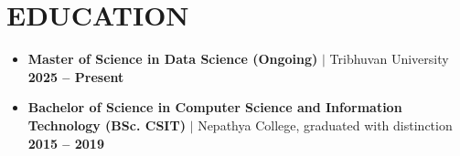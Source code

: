 \documentclass[10pt,a4paper]{article}
\begin{document}
\section{EDUCATION}
\begin{itemize}
    \item \textbf{Master of Science in Data Science (Ongoing)} $|$ Tribhuvan University \hfill \textbf{2025 -- Present}
    \item \textbf{Bachelor of Science in Computer Science and Information Technology (BSc. CSIT)} $|$ Nepathya College, graduated with distinction \hfill \textbf{2015 -- 2019}
\end{itemize}
\end{document}

